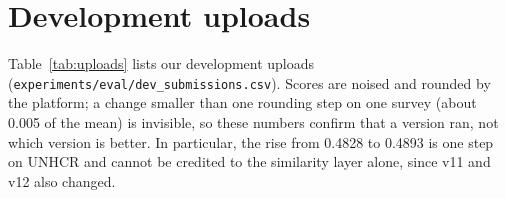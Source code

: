 \documentclass{article}
\begin{document}
\section{Development uploads}
\label{app:uploads}
Table~\ref{tab:uploads} lists our development uploads (\texttt{experiments/eval/dev\_submissions.csv}). Scores are noised and rounded by the platform; a change smaller than one rounding step on one survey (about 0.005 of the mean) is invisible, so these numbers confirm that a version ran, not which version is better. In particular, the rise from 0.4828 to 0.4893 is one step on UNHCR and cannot be credited to the similarity layer alone, since v11 and v12 also changed.

\begin{table}[h]
\centering
\small
\caption{Development uploads (rounded leaderboard values as displayed; blank: not recorded).}
\label{tab:uploads}
\end{table}
\end{document}
